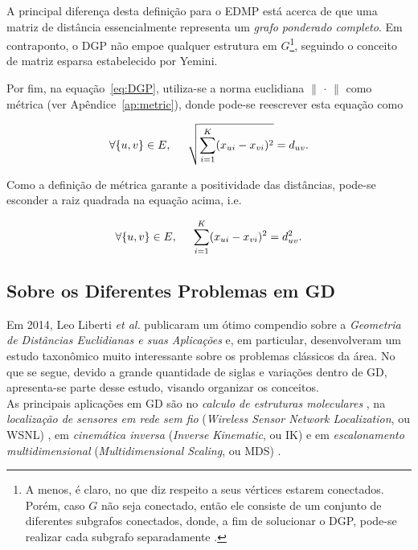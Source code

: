 \documentclass[a4paper,12pt]{article}
\begin{document}
A principal diferença desta definição para o EDMP está acerca de que uma matriz de distância essencialmente representa um \textit{grafo ponderado completo}. Em contraponto, o DGP não empoe qualquer estrutura em $G$\footnote{A menos, é claro, no que diz respeito a seus vértices estarem conectados. Porém, caso $G$ não seja conectado, então ele consiste de um conjunto de diferentes subgrafos conectados, donde, a fim de solucionar o DGP, pode-se realizar cada subgrafo separadamente \cite{libertiEDG}.}, seguindo o conceito de matriz esparsa estabelecido por Yemini.

Por fim, na equação~\ref{eq:DGP}, utiliza-se a norma euclidiana $\lVert$ $\cdot$ $\rVert$ como métrica (ver Apêndice~\ref{ap:metric}), donde pode-se reescrever esta equação como

\begin{equation*}
	\forall \{u,v\} \in E, \hspace{0.5cm} \sqrt{\sum_{i=1}^{K}(x_{ui} - x_{vi})^2} = d_{uv}.
\end{equation*}

Como a definição de métrica garante a positividade das distâncias, pode-se esconder a raiz quadrada na equação acima, i.e.

\begin{equation}
\forall \{u,v\} \in E, \hspace{0.5cm} \sum_{i=1}^{K}(x_{ui} - x_{vi})^2 = d_{uv}^2.
\end{equation}

\subsection{Sobre os Diferentes Problemas em GD}

Em 2014, Leo Liberti \textit{et al.} publicaram um ótimo compendio sobre a \textit{Geometria de Distâncias Euclidianas e suas Aplicações} \cite{carlileGDandAplications} e, em particular, desenvolveram um estudo  taxonômico muito interessante sobre os problemas clássicos da área. No que se segue, devido a grande quantidade de siglas e variações dentro de GD, apresenta-se parte desse estudo, visando organizar os conceitos. 
\\

As principais aplicações em GD são no \textit{calculo de estruturas moleculares} \cite{crippen:DistancesAndMolecularConformation}, na \textit{localização de sensores em rede sem fio} (\textit{Wireless Sensor Network Localization}, ou WSNL) \cite{yemini1978positioning}, em \textit{cinemática inversa} (\textit{Inverse Kinematic}, ou IK) \cite{cinematicaInversa} e em \textit{escalonamento multidimensional} (\textit{Multidimensional Scaling}, ou MDS) \cite{multidimensionalScaling}.
\end{document}
